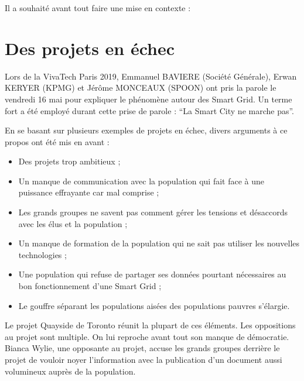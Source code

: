 Il a souhaité avant tout faire une mise en contexte :



\section{Des projets en échec}

Lors de la VivaTech Paris 2019, Emmanuel BAVIERE (Société Générale), Erwan KERYER (KPMG)
et Jérôme MONCEAUX (SPOON) ont pris la parole le vendredi 16 mai pour expliquer le phénomène autour des
Smart Grid. Un terme fort a été employé durant cette prise de parole :
``La Smart City ne marche pas''.

En se basant sur plusieurs exemples de projets en échec, divers arguments à ce propos ont été mis en
avant :
\begin{itemize}
    \item Des projets trop ambitieux ;
    \item Un manque de communication avec la population qui fait face à une puissance effrayante car mal comprise ;
    \item Les grands groupes ne savent pas comment gérer les tensions et désaccords avec les élus et la population ;
    \item Un manque de formation de la population qui ne sait pas utiliser les nouvelles technologies ;
    \item Une population qui refuse de partager ses données pourtant nécessaires au bon fonctionnement d’une Smart Grid ;
    \item Le gouffre séparant les populations aisées des populations pauvres s'élargie.
\end{itemize}

Le projet Quayside de Toronto réunit la plupart de ces éléments.
Les oppositions au projet sont multiple. On lui reproche avant tout son manque de démocratie.
Bianca Wylie, une opposante au projet, accuse les grands groupes derrière le projet de vouloir noyer l'information
avec la publication d'un document aussi volumineux auprès de la population.